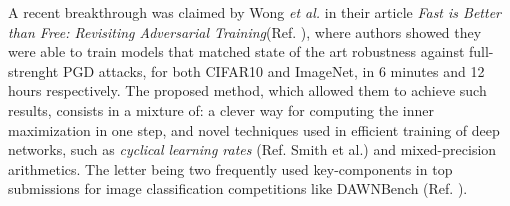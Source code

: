 \documentclass[LaM,binding=0.6cm]{./packages/sapthesis/sapthesis}
\begin{document}
        A recent breakthrough was claimed by Wong \textit{et al.} in their article \textit{Fast is Better than Free: Revisiting Adversarial Training}(Ref. ),
        where authors showed they were able to train models that matched state of the art robustness against full-strenght PGD attacks, for both CIFAR10
        and ImageNet, in 6 minutes and 12 hours respectively. The proposed method, which allowed them to achieve such results, consists in a mixture of: 
        a clever way for computing the inner maximization in one step, and novel techniques used in efficient 
        training of deep networks, such as \textit{cyclical learning rates} (Ref. Smith et al.) and mixed-precision arithmetics. The letter being 
        two frequently used key-components in top submissions for image classification competitions like DAWNBench (Ref. ).
        
\end{document}
